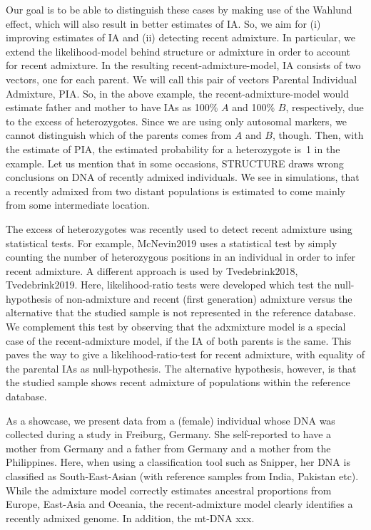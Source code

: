 \documentclass[12pt]{article}
\theoremstyle{definition}
\begin{document}
Our goal is to be able to distinguish these cases by making use of the
Wahlund effect, which will also result in better estimates of IA. So,
we aim for (i) improving estimates of IA and (ii) detecting recent
admixture. In particular, we extend the likelihood-model behind {\sc
  structure} or {\sc admixture} in order to account for recent
admixture. In the resulting recent-admixture-model, IA consists of two
vectors, one for each parent. We will call this pair of vectors
Parental Individual Admixture, PIA. So, in the above example, the
recent-admixture-model would estimate father and mother to have IAs as
100\% $A$ and 100\% $B$, respectively, due to the excess of
heterozygotes.  Since we are using only autosomal markers, we cannot
distinguish which of the parents comes from $A$ and $B$, though. Then,
with the estimate of PIA, the estimated probability for a heterozygote
is~1 in the example. Let us mention that in some occasions, {\sc
  STRUCTURE} draws wrong conclusions on DNA of recently admixed
individuals. We see in simulations, that a recently admixed from two
distant populations is estimated to come mainly from some intermediate
location.

The excess of heterozygotes was recently used to detect recent
admixture using statistical tests. For example,
\cite{article}{McNevin2019} uses a statistical test by simply counting
the number of heterozygous positions in an individual in order to
infer recent admixture. A different approach is used by
\cite{article}{Tvedebrink2018, Tvedebrink2019}. Here,
likelihood-ratio tests were developed which test the null-hypothesis
of non-admixture and recent (first generation) admixture versus the
alternative that the studied sample is not represented in the
reference database. We complement this test by observing that the
adxmixture model is a special case of the recent-admixture model, if
the IA of both parents is the same. This paves the way to give a
likelihood-ratio-test for recent admixture, with equality of the
parental IAs as null-hypothesis. The alternative hypothesis, however,
is that the studied sample shows recent admixture of populations
within the reference database.

As a showcase, we present data from a (female) individual whose DNA
was collected during a study in Freiburg, Germany. She self-reported
to have a mother from Germany and a father from Germany and a mother
from the Philippines. Here, when using a classification tool such as
{\sc Snipper}, her DNA is classified as South-East-Asian (with
reference samples from India, Pakistan etc). While the admixture model
correctly estimates ancestral proportions from Europe, East-Asia and
Oceania, the recent-admixture model clearly identifies a recently
admixed genome. In addition, the mt-DNA xxx.
\end{document}

